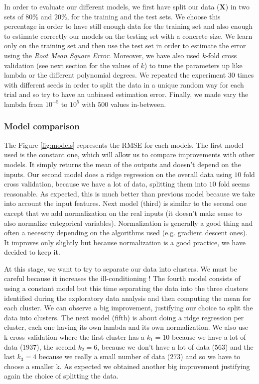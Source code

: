\documentclass{article} %
\begin{document}
In order to evaluate our different models, we first have split our data ($\mathbf{X}$) in two sets of $80\%$ and $20\%$, for the training and the test sets. We choose this percentage in order to have still enough data for the training set and also enough to estimate correctly our models on the testing set with a concrete size. We learn only on the training set and then use the test set in order to estimate the error using the \textit{Root Mean Square Error}. Moreover, we have also used $k$-fold cross validation (see next section for the values of $k$) to tune the parameters up like lambda or the different polynomial degrees. We repeated the experiment $30$ times with different seeds in order to split the data in a unique random way for each trial and so try to have an unbiased estimation error. Finally, we made vary the lambda from $10^{-5}$ to $10^{5}$ with $500$ values in-between.

\subsubsection{Model comparison}

The Figure \ref{fig:models} represents the RMSE for each models. The first model used is the constant one, which will allow us to compare improvements with other models. It simply returns the mean of the outputs and doesn't depend on the inputs. Our second model does a ridge regression on the overall data using $10$ fold cross validation, because we have a lot of data, splitting them into $10$ fold seems reasonable. As expected, this is much better than previous model because we take into account the input features. Next model (third) is similar to the second one except that we add normalization on the real inputs (it doesn't make sense to also normalize categorical variables). Normalization is generally a good thing and often a necessity depending on the algorithms used (e.g. gradient descent ones). It improves only slightly but because normalization is a good practice, we have decided to keep it.

At this stage, we want to try to separate our data into clusters. We must be careful because it increases the ill-conditioning ! The fourth model consists of using a constant model but this time separating the data into the three clusters identified during the exploratory data analysis and then computing the mean for each cluster. We can observe a big improvement, justifying our choice to split the data into clusters. The next model (fifth) is about doing a ridge regression per cluster, each one having its own lambda and its own normalization. We also use k-cross validation where the first cluster has a $k_1=10$ because we have a lot of data ($1937$), the second $k_2=6$, because we don't have a lot of data ($563$) and the last $k_3=4$ because we really a small number of data ($273$) and so we have to choose a smaller k. As expected we obtained another big improvement justifying again the choice of splitting the data.
\end{document}

